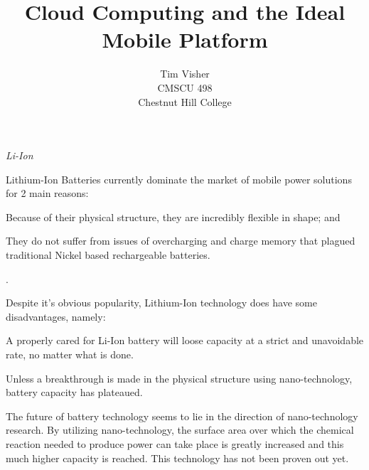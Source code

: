 \documentclass[letterpaper]{article}
\author{Tim Visher\\ CMSCU 498\\ Chestnut Hill College}
\title{Cloud Computing and the Ideal Mobile Platform}
\begin{document}
\Huge{

  \begin{center}
    \emph{Li-Ion}
  \end{center}}

\huge{

  Lithium-Ion Batteries currently dominate the market of mobile power solutions
  for 2 main reasons:
  \begin{inparaenum}[(1)]
  \item Because of their physical structure, they are incredibly flexible in
    shape; and
  \item They do not suffer from issues of overcharging and charge memory that
    plagued traditional Nickel based rechargeable batteries.
  \end{inparaenum}.

  Despite it's obvious popularity, Lithium-Ion technology does have some
  disadvantages, namely:
  \begin{inparaenum}[(1)]
  \item A properly cared for Li-Ion battery will loose capacity at a strict and
    unavoidable rate, no matter what is done.
  \item Unless a breakthrough is made in the physical structure using
    nano-technology, battery capacity has plateaued.
  \end{inparaenum}

  The future of battery technology seems to lie in the direction of
  nano-technology research.  By utilizing nano-technology, the surface area over
  which the chemical reaction needed to produce power can take place is greatly
  increased and this much higher capacity is reached.  This technology has not
  been proven out yet.}

\newpage
\end{document}
